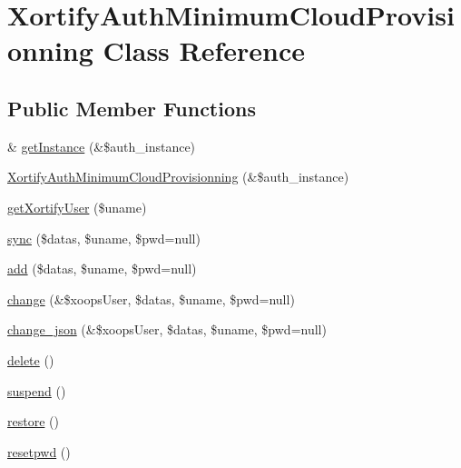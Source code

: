 \hypertarget{class_xortify_auth_minimum_cloud_provisionning}{\section{Xortify\-Auth\-Minimum\-Cloud\-Provisionning Class Reference}
\label{class_xortify_auth_minimum_cloud_provisionning}
}
\subsection*{Public Member Functions}
\begin{DoxyCompactItemize}
\item 
\& \hyperlink{class_xortify_auth_minimum_cloud_provisionning_a2c8eaa915c70d75289ac8a03686194f9}{get\-Instance} (\&\$auth\-\_\-instance)
\item 
\hyperlink{class_xortify_auth_minimum_cloud_provisionning_a8579b3306fed02b8650e98d07834f425}{Xortify\-Auth\-Minimum\-Cloud\-Provisionning} (\&\$auth\-\_\-instance)
\item 
\hyperlink{class_xortify_auth_minimum_cloud_provisionning_a041d726ac26672547ed1504e8e0117aa}{get\-Xortify\-User} (\$uname)
\item 
\hyperlink{class_xortify_auth_minimum_cloud_provisionning_a35dc08b0f2138eb818ff95345b73bcff}{sync} (\$datas, \$uname, \$pwd=null)
\item 
\hyperlink{class_xortify_auth_minimum_cloud_provisionning_adfc9fcef01e7bd7b2f47e8e79d51fc63}{add} (\$datas, \$uname, \$pwd=null)
\item 
\hyperlink{class_xortify_auth_minimum_cloud_provisionning_ae1f0971b9712c794620cf309164e43af}{change} (\&\$xoops\-User, \$datas, \$uname, \$pwd=null)
\item 
\hyperlink{class_xortify_auth_minimum_cloud_provisionning_a94f4e0408f26e65abca347ec883f4ec9}{change\-\_\-json} (\&\$xoops\-User, \$datas, \$uname, \$pwd=null)
\item 
\hyperlink{class_xortify_auth_minimum_cloud_provisionning_a13bdffdd926f26b825ea57066334ff01}{delete} ()
\item 
\hyperlink{class_xortify_auth_minimum_cloud_provisionning_ad73006a505121228f3b075c2409787d2}{suspend} ()
\item 
\hyperlink{class_xortify_auth_minimum_cloud_provisionning_aa1371f22826cf8cde4454c9b467203d0}{restore} ()
\item 
\hyperlink{class_xortify_auth_minimum_cloud_provisionning_a06d70fbd3a2db390b6f2530c0076628e}{resetpwd} ()
\end{DoxyCompactItemize}
